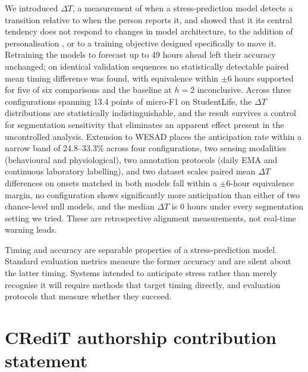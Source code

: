 \documentclass[preprint,12pt,authoryear]{elsarticle}
\newcommand{\dt}{$\Delta T$}
\providecommand{\DIFaddtex}[1]{{\protect\color{blue} \sf #1}} %
\providecommand{\DIFdeltex}[1]{{\protect\color{red} \scriptsize #1}} %
\providecommand{\DIFaddbegin}{} %
\providecommand{\DIFaddend}{} %
\providecommand{\DIFdelbegin}{} %
\providecommand{\DIFdelend}{} %
\providecommand{\DIFadd}[1]{\texorpdfstring{\DIFaddtex{#1}}{#1}} %
\providecommand{\DIFdel}[1]{\texorpdfstring{\DIFdeltex{#1}}{}} %
\newcommand{\DIFscaledelfig}{0.5}
\newlength{\DIFdelgraphicswidth} %
\newlength{\DIFdelgraphicsheight} %
\newcommand{\DIFaddincludegraphics}[2][]{{\color{blue}\fbox{\DIFOincludegraphics[#1]{#2}}}} %
\newcommand{\DIFdelincludegraphics}[2][]{%
\sbox{\DIFdelgraphicsbox}{\DIFOincludegraphics[#1]{#2}}%
\settoboxwidth{\DIFdelgraphicswidth}{\DIFdelgraphicsbox} %
\settoboxtotalheight{\DIFdelgraphicsheight}{\DIFdelgraphicsbox} %
\scalebox{\DIFscaledelfig}{%
\parbox[b]{\DIFdelgraphicswidth}{\usebox{\DIFdelgraphicsbox}\\[-\baselineskip] \rule{\DIFdelgraphicswidth}{0em}}\llap{\resizebox{\DIFdelgraphicswidth}{\DIFdelgraphicsheight}{%
\setlength{\unitlength}{\DIFdelgraphicswidth}%
\begin{picture}(1,1)%
\thicklines\linethickness{2pt} %
{\color[rgb]{1,0,0}\put(0,0){\framebox(1,1){}}}%
{\color[rgb]{1,0,0}\put(0,0){\line( 1,1){1}}}%
{\color[rgb]{1,0,0}\put(0,1){\line(1,-1){1}}}%
\end{picture}%
}\hspace*{3pt}}} %
} %
\DeclareRobustCommand{\DIFaddbegin}{\DIFOaddbegin \let\includegraphics\DIFaddincludegraphics} %
\DeclareRobustCommand{\DIFaddend}{\DIFOaddend \let\includegraphics\DIFOincludegraphics} %
\DeclareRobustCommand{\DIFdelbegin}{\DIFOdelbegin \let\includegraphics\DIFdelincludegraphics} %
\DeclareRobustCommand{\DIFdelend}{\DIFOaddend \let\includegraphics\DIFOincludegraphics} %
\begin{document}
We introduced \dt{}, a measurement of when a stress-prediction model
detects a transition relative to when the person reports it, and showed
that \DIFdelbegin \DIFdel{it }\DIFdelend \DIFaddbegin \DIFadd{its central tendency }\DIFaddend does not respond to \DIFdelbegin \DIFdel{changes in model architecture, to }\DIFdelend the addition of
personalisation \DIFdelbegin \DIFdel{, }\DIFdelend or to a training objective designed specifically to
move it. \DIFaddbegin \DIFadd{Retraining the models to forecast up to 49 hours ahead left
their accuracy unchanged; on identical validation sequences no
statistically detectable paired mean timing difference was found, with
equivalence within $\pm 6$ hours supported for five of six comparisons
and the baseline at $h = 2$ inconclusive. }\DIFaddend Across three configurations spanning \DIFdelbegin \DIFdel{13.4
}\DIFdelend \DIFaddbegin \DIFadd{13.3 }\DIFaddend points of
micro-F1 on StudentLife, \DIFdelbegin \DIFdel{the \dt{} distributions are
statistically indistinguishable, and the result survives a control for
segmentation sensitivity that eliminates an apparent effect present in the uncontrolled analysis. Extension to WESAD places the anticipation
rate within a narrow band of 24.8--33.3\% across four configurations,
two sensing modalities (behavioural and physiological), two annotation
protocols (daily EMA and continuous laboratory labelling), and two
dataset scales}\DIFdelend \DIFaddbegin \DIFadd{paired mean \dt{} differences on onsets
matched in both models fall within a $\pm 6$-hour equivalence margin,
no configuration shows significantly more anticipation than either of
two chance-level null models, and the median \dt{} is 0 hours under
every segmentation setting we tried. These are retrospective alignment
measurements, not real-time warning leads}\DIFaddend .

Timing and accuracy are separable properties of a stress-prediction
model. Standard evaluation metrics measure \DIFdelbegin \DIFdel{the former }\DIFdelend \DIFaddbegin \DIFadd{accuracy }\DIFaddend and are silent about
\DIFdelbegin \DIFdel{the latter}\DIFdelend \DIFaddbegin \DIFadd{timing}\DIFaddend . Systems intended to anticipate stress rather than
merely recognise it will require methods that target timing directly,
and evaluation protocols that measure whether they succeed.

\section*{CRediT authorship contribution statement}
\end{document}
